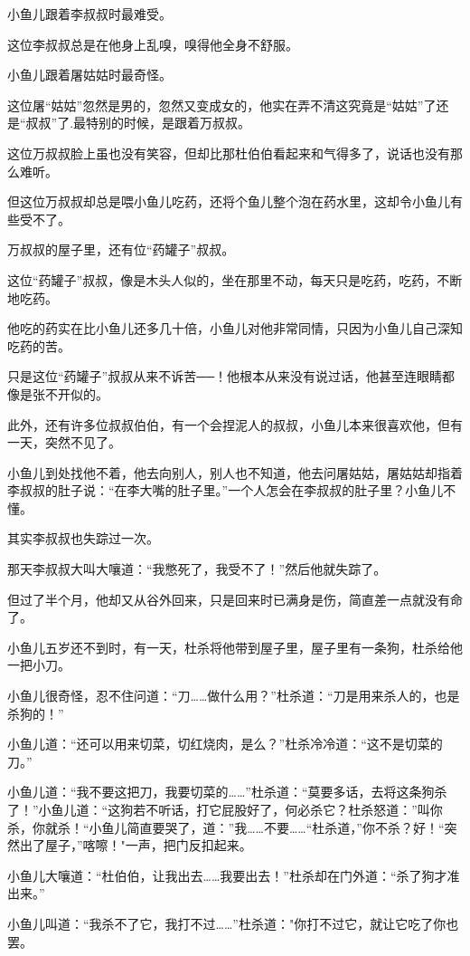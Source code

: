 \documentclass[12pt,oneside]{book}
\begin{document}
小鱼儿跟着李叔叔时最难受。

这位李叔叔总是在他身上乱嗅，嗅得他全身不舒服。

小鱼儿跟着屠姑姑时最奇怪。

这位屠``姑姑''忽然是男的，忽然又变成女的，他实在弄不清这究竟是``姑姑''了还是``叔叔''了.最特别的时候，是跟着万叔叔。

这位万叔叔脸上虽也没有笑容，但却比那杜伯伯看起来和气得多了，说话也没有那么难听。

但这位万叔叔却总是喂小鱼儿吃药，还将个鱼儿整个泡在药水里，这却令小鱼儿有些受不了。

万叔叔的屋子里，还有位``药罐子''叔叔。

这位``药罐子''叔叔，像是木头人似的，坐在那里不动，每天只是吃药，吃药，不断地吃药。

他吃的药实在比小鱼儿还多几十倍，小鱼儿对他非常同情，只因为小鱼儿自己深知吃药的苦。

只是这位``药罐子''叔叔从来不诉苦──！他根本从来没有说过话，他甚至连眼睛都像是张不开似的。

此外，还有许多位叔叔伯伯，有一个会捏泥人的叔叔，小鱼儿本来很喜欢他，但有一天，突然不见了。

小鱼儿到处找他不着，他去向别人，别人也不知道，他去问屠姑姑，屠姑姑却指着李叔叔的肚子说：``在李大嘴的肚子里。''一个人怎会在李叔叔的肚子里？小鱼儿不懂。

其实李叔叔也失踪过一次。

那天李叔叔大叫大嚷道：``我憋死了，我受不了！''然后他就失踪了。

但过了半个月，他却又从谷外回来，只是回来时已满身是伤，简直差一点就没有命了。

小鱼儿五岁还不到时，有一天，杜杀将他带到屋子里，屋子里有一条狗，杜杀给他一把小刀。

小鱼儿很奇怪，忍不住问道：``刀\ldots\ldots 做什么用？''杜杀道：``刀是用来杀人的，也是杀狗的！''

小鱼儿道：``还可以用来切菜，切红烧肉，是么？''杜杀冷冷道：``这不是切菜的刀。''

小鱼儿道：``我不要这把刀，我要切菜的\ldots\ldots{}''杜杀道：``莫要多话，去将这条狗杀了！''小鱼儿道：``这狗若不听话，打它屁股好了，何必杀它？杜杀怒道：''叫你杀，你就杀！``小鱼儿简直要哭了，道：''我\ldots\ldots 不要\ldots\ldots{}``杜杀道，''你不杀？好！``突然出了屋子，''喀嚓！"一声，把门反扣起来。

小鱼儿大嚷道：``杜伯伯，让我出去\ldots\ldots 我要出去！''杜杀却在门外道：``杀了狗才准出来。''

小鱼儿叫道：``我杀不了它，我打不过\ldots\ldots{}''杜杀道："你打不过它，就让它吃了你也罢。
\end{document}
